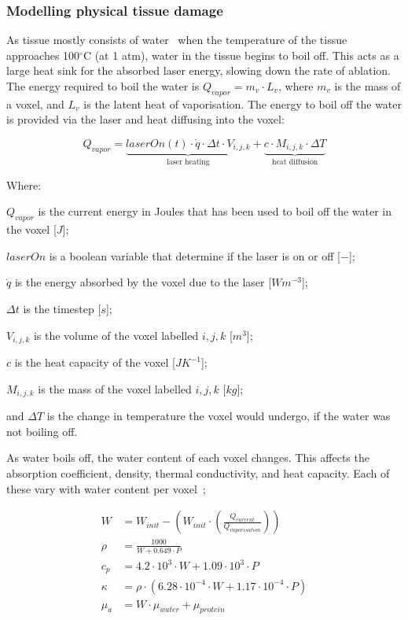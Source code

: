 \subsubsection*{Modelling physical tissue damage}

As tissue mostly consists of water~\cite{meglinski2002quantitative} when the temperature of the tissue approaches 100$^{\circ}$C (at 1 atm), water in the tissue begins to boil off. This acts as a large heat sink for the absorbed laser energy, slowing down the rate of ablation. The energy required to boil the water is $Q_{vapor}=m_v\cdot L_v$, where $m_v$ is the mass of a voxel, and $L_v$ is the latent heat of vaporisation. The energy to boil off the water is provided via the laser and heat diffusing into the voxel:

\begin{equation}
Q_{vapor}=\underbrace{laserOn(t)\cdot\dot{q}\cdot \Delta t\cdot V_{i,j,k}}_\text{laser heating} + \underbrace{c\cdot M_{i,j,k}\cdot\Delta T}_\text{heat diffusion}
\end{equation}

\noindent Where:

	\indent $Q_{vapor}$ is the current energy in Joules that has been used to boil off the water in the voxel [$J$];
	
	\indent $laserOn$ is a boolean variable that determine if the laser is on or off [$-$];
	
	\indent $\dot{q}$ is the energy absorbed by the voxel due to the laser [$W m^{-3}$];
	
	\indent $\Delta t$ is the timestep [$s$];
	
	\indent $V_{i,j,k}$ is the volume of the voxel labelled $i,j,k$ [$m^3$];
	
	\indent $c$ is the heat capacity of the voxel [$J K^{-1}$];
	
	\indent $M_{i,j,k}$ is the mass of the voxel labelled $i,j,k$ [$kg$];
	
	\indent and $\Delta T$ is the change in temperature the voxel would undergo, if the water was not boiling off.

	\medskip
	
As water boils off, the water content of each voxel changes. This affects the absorption coefficient, density, thermal conductivity, and heat capacity. Each of these vary with water content per voxel~\cite{loiola2018thermal};

\begin{align}
W &= W_{init} - \left(W_{init} \cdot \left(\tfrac{Q_{current}}{Q_{vaporisation}}\right)\right) \\
\rho &= \frac{1000}{W + 0.649\cdot P} \\
c_p &= 4.2\cdot 10^{3}\cdot W + 1.09\cdot 10^{3}\cdot P \\
\kappa &= \rho \cdot (6.28\cdot 10^{-4}\cdot W + 1.17\cdot 10^{-4} \cdot P)\\
\mu_a &= W \cdot \mu_{water} + \mu_{protein}\\
\end{align}


